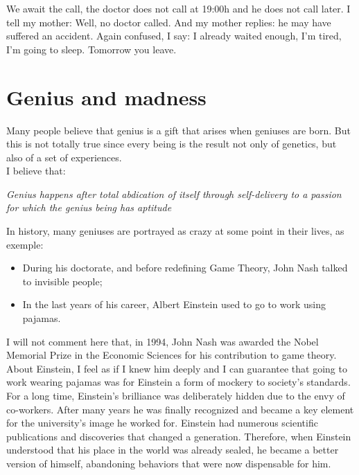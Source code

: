 \documentclass[11pt]{book}
\begin{document}
\noindent We await the call, the doctor does not call at 19:00h and he does not call later. I tell my mother: Well, no doctor called. And my mother replies: he may have suffered an accident. Again confused, I say: I already waited enough, I'm tired, I'm going to sleep. Tomorrow you leave. \\

\chapter{Genius and madness}

\noindent Many people believe that genius is a gift that arises when geniuses are born. But this is not totally true since every being is the result not only of genetics, but also of a set of experiences. \\

\noindent I believe that:

\noindent \begin{center} \emph{Genius happens after total abdication of itself through self-delivery to a passion for which the genius being has aptitude} \end{center} 

\noindent In history, many geniuses are portrayed as crazy at some point in their lives, as exemple:

\begin{itemize}
\item During his doctorate, and before redefining Game Theory, John Nash talked to invisible people; 
\item In the last years of his career, Albert Einstein used to go to work using pajamas. 
\end{itemize}

\noindent I will not comment here that, in 1994, John Nash was awarded the Nobel Memorial Prize in the Economic Sciences for his contribution to game theory. \\

\noindent About Einstein, I feel as if I knew him deeply and I can guarantee that going to work wearing pajamas was for Einstein a form of mockery to society's standards. \\

\noindent For a long time, Einstein's brilliance was deliberately hidden due to the envy of co-workers. After many years he was finally recognized and became a key element for the university's image he worked for. Einstein had numerous scientific publications and discoveries that changed a generation. Therefore, when Einstein understood that his place in the world was already sealed, he became a better version of himself, abandoning behaviors that were now dispensable for him. \\
\end{document}
